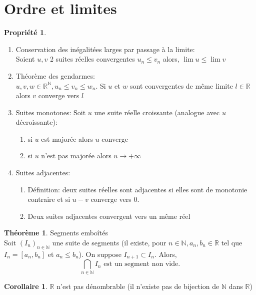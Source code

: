 \documentclass[fleqn]{article}
\theoremstyle{definition} \newtheorem*{defi}{D\'efinition}
\theoremstyle{definition} \newtheorem*{theo}{Th\'eor\`eme}
\theoremstyle{definition} \newtheorem*{prop}{Propri\'et\'e}
\theoremstyle{definition} \newtheorem*{coro}{Corollaire}
\theoremstyle{remark} \newtheorem*{rqs}{Remarque}
\begin{document}
\section{Ordre et limites}
\begin{prop} $ $
	\begin{enumerate}
		\item Conservation des in\'egalit\'ees larges par passage \`a la limite: \\
			Soient $u, v$ 2 suites r\'eelles convergentes $u_n \leq v_n$ alors, $\lim u \leq \lim v$
		\item Th\'eor\`eme des gendarmes: \\
			$u, v, w \in \mathbb{R}^\mathbb{N}, u_n \leq v_n \leq w_n$. Si $u$ et $w$ sont convergentes de m\^eme limite $l \in \mathbb{R}$
			alors $v$ converge vers $l$
		\item Suites monotones:
			Soit $u$ une suite r\'eelle croissante (analogue avec $u$ d\'ecroissante):
			\begin{enumerate}
				\item si $u$ est major\'ee alors $u$ converge
				\item si $u$ n'est pas major\'ee alors $u \rightarrow +\infty$
			\end{enumerate}
		\item Suites adjacentes:
			\begin{enumerate}
				\item D\'efinition: deux suites r\'eelles sont adjacentes si elles sont de monotonie contraire et si $u-v$ converge vers 0.
				\item Deux suites adjacentes convergent vers un m\^eme r\'eel
			\end{enumerate}
	\end{enumerate}
\end{prop}
\begin{theo} Segments embo\^it\'es \\
	Soit $(I_n)_{n \in \mathbb{N}}$ une suite de segments (il existe, pour
	$n \in \mathbb{N}, a_n, b_n \in \mathbb{R}$ tel que $I_n = [a_n, b_n]$ et $a_n \leq b_n$). On suppose $I_{n+1} \subset I_n$. Alors,
	\[\bigcap_{n \in \mathbb{N}} I_n \text{ est un segment non vide.}\]
\end{theo}
\begin{coro}
	$\mathbb{R}$ n'est pas d\'enombrable (il n'existe pas de bijection de $\mathbb{N}$ dans $\mathbb{R}$)
\end{coro}
\end{document}

